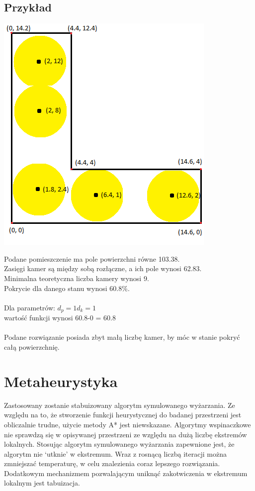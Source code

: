 \documentclass[12pt,a4paper]{article}
\begin{document}
\subsection{Przykład}
\begin{center}
\includegraphics[scale=0.9]{example_projection.png}
\end{center}
Podane pomieszczenie ma pole powierzchni równe 103.38. \\
Zasięgi kamer są między sobą rozłączne, a ich pole wynosi 62.83. \\
Minimalna teoretyczna liczba kamery wynosi 9. \\
Pokrycie dla danego stanu wynosi 60.8\%. \\ \\
Dla parametrów:
$d_p = 1 d_k = 1$ \\
wartość funkcji wynosi 60.8-0 = 60.8 \\ \\
Podane rozwiązanie posiada zbyt małą liczbę kamer, by móc w stanie pokryć całą powierzchnię.
\section{Metaheurystyka}
Zastosowany zostanie stabuizowany algorytm symulowanego wyżarzania.
Ze względu na to, że stworzenie funkcji heurystycznej do badanej przestrzeni jest obliczalnie
trudne, użycie metody A* jest niewskazane.
Algorytmy wspinaczkowe nie sprawdzą się w opisywanej przestrzeni ze względu na dużą liczbę
ekstremów lokalnych. Stosując algorytm symulowanego wyżarzania zapewnione jest,
że algorytm nie ‘utknie’ w ekstremum. Wraz z rosnącą liczbą iteracji można zmniejszać temperaturę,
w celu znalezienia coraz lepszego rozwiązania. Dodatkowym mechanizmem pozwalającym uniknąć
zakotwiczenia w ekstremum lokalnym jest tabuizacja.\\
\end{document}
